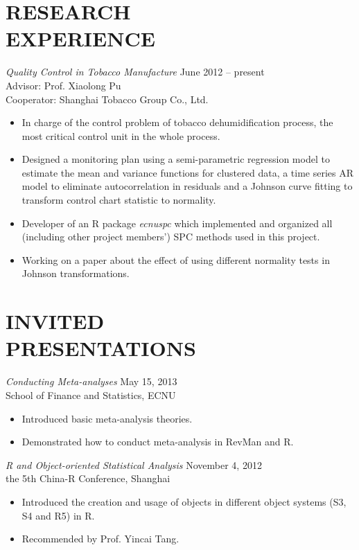 \documentclass[margin]{res}
\begin{document}
\begin{resume}
		\section{RESEARCH \\EXPERIENCE} {\sl Quality Control in Tobacco Manufacture} \hfill June 2012 – present \\
		Advisor: Prof. Xiaolong Pu \\
		Cooperator: Shanghai Tobacco Group Co., Ltd.
		\begin{itemize}  \itemsep -2pt %
			\item In charge of the control problem of tobacco dehumidification process, the most critical control unit in the whole process. 
			\item Designed a monitoring plan using a semi-parametric regression model to estimate the mean and variance functions for clustered data, a time series AR model to eliminate autocorrelation in residuals and a Johnson curve fitting to transform control chart statistic to normality.
			\item Developer of an R package \emph{ecnuspc} which implemented and organized all (including other project members') SPC methods used in this project.
			\item Working on a paper about the effect of using different normality tests in Johnson transformations. 
		\end{itemize}
		
		
		\section{INVITED \\PRESENTATIONS}
		{\sl Conducting Meta-analyses} \hfill May 15, 2013\\
		School of Finance and Statistics, ECNU
		\begin{itemize}  \itemsep -2pt %
			\item Introduced basic meta-analysis theories.
			\item Demonstrated how to conduct meta-analysis in RevMan and R.
		\end{itemize}
		
		{\sl R and Object-oriented Statistical Analysis} \hfill November 4, 2012\\
		the 5th China-R Conference, Shanghai
		\begin{itemize}  \itemsep -2pt %
			\item Introduced the creation and usage of objects in different object systems (S3, S4 and R5) in R.
			\item Recommended by Prof. Yincai Tang.
		\end{itemize} 
		

\end{resume}
\end{document}
